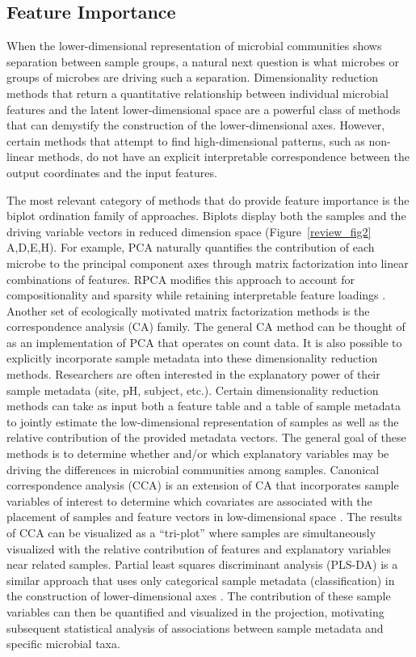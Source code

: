 \subsection{Feature Importance} When the lower-dimensional representation of microbial communities shows separation between sample groups, a natural next question is what microbes or groups of microbes are driving such a separation. Dimensionality reduction methods that return a quantitative relationship between individual microbial features and the latent lower-dimensional space are a powerful class of methods that can demystify the construction of the lower-dimensional axes. However, certain methods that attempt to find high-dimensional patterns, such as non-linear methods, do not have an explicit interpretable correspondence between the output coordinates and the input features.

The most relevant category of methods that do provide feature importance is the biplot ordination family of approaches. Biplots display both the samples and the driving variable vectors in reduced dimension space (Figure~\ref{review_fig2} A,D,E,H). For example, PCA naturally quantifies the contribution of each microbe to the principal component axes through matrix factorization into linear combinations of features. RPCA modifies this approach to account for compositionality and sparsity while retaining interpretable feature loadings \cite{Martino2019-op}. Another set of ecologically motivated matrix factorization methods is the correspondence analysis (CA) family. The general CA method can be thought of as an implementation of PCA that operates on count data. It is also possible to explicitly incorporate sample metadata into these dimensionality reduction methods. Researchers are often interested in the explanatory power of their sample metadata (site, pH, subject, etc.). Certain dimensionality reduction methods can take as input both a feature table and a table of sample metadata to jointly estimate the low-dimensional representation of samples as well as the relative contribution of the provided metadata vectors. The general goal of these methods is to determine whether and/or which explanatory variables may be driving the differences in microbial communities among samples. Canonical correspondence analysis (CCA) is an extension of CA that incorporates sample variables of interest to determine which covariates are associated with the placement of samples and feature vectors in low-dimensional space \cite{Ter_Braak1985-ge}. The results of CCA can be visualized as a “tri-plot” where samples are simultaneously visualized with the relative contribution of features and explanatory variables near related samples. \cite{Ruiz-Perez2020-tb,Paliy2016-az} Partial least squares discriminant analysis (PLS-DA) is a similar approach that uses only categorical sample metadata (classification) in the construction of lower-dimensional axes \cite{Barker2003-ce,Ruiz-Perez2020-tb}. The contribution of these sample variables can then be quantified and visualized in the projection, motivating subsequent statistical analysis of associations between sample metadata and specific microbial taxa.

